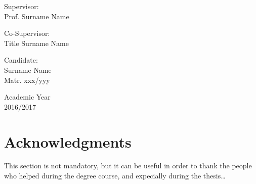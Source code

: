 \begin{center}
\begin{multicols}{2}
	{\large Supervisor:\\}
	Prof. Surname Name\\
	\vspace{5mm}
	
	{\large Co-Supervisor:\\}
	Title Surname Name\\
	\vspace{5mm}
	
	{\large Candidate:\\}
	Surname Name\\
	Matr. xxx/yyy\\
	\vspace{10mm}
\end{multicols}

\vfill

{\large Academic Year\\ 2016/2017}

\end{center}



%
%
\newpage
\openright

\noindent
\chapter*{Acknowledgments}
This section is not mandatory, but it can be useful in order to thank the people who helped during the degree course, and expecially during the thesis\dots

%
%
\newpage
\openright

\tableofcontents

%
%


